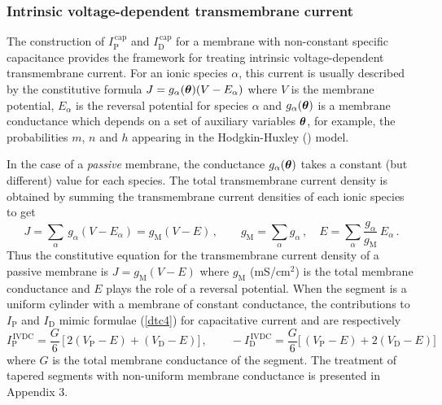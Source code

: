 \subsubsection{Intrinsic voltage-dependent transmembrane current}

The construction of $I^\mathrm{\,cap}_\mathrm{P}$ and
$I^\mathrm{\,cap}_\mathrm{D}$ for a membrane with non-constant
specific capacitance provides the framework for treating intrinsic
voltage-dependent transmembrane current. For an ionic species
$\alpha$, this current is usually described by the constitutive
formula $J=g_\alpha(\boldsymbol{\theta})(V-E_\alpha)$ where $V$ is the
membrane potential, $E_\alpha$ is the reversal potential for
species $\alpha$ and $g_\alpha(\boldsymbol{\theta})$ is a membrane
conductance which depends on a set of auxiliary variables
$\boldsymbol{\theta}$, for example, the probabilities $m$, $n$ and $h$
appearing in the Hodgkin-Huxley (\cite{Hodgkin52}) model.

In the case of a \emph{passive} membrane, the conductance
$g_\alpha(\boldsymbol{\theta})$ takes a constant (but different) value for
each species. The total transmembrane current density is obtained
by summing the transmembrane current densities of each ionic
species to get
\begin{equation}\label{dtc8}
J=\sum_\alpha\, g_\alpha(V-E_\alpha)= g_\mathrm{M}(V-E)\,,
\qquad g_\mathrm{M}=\sum_\alpha g_\alpha\,,\quad
E=\sum_\alpha \frac{g_\alpha}{g_\mathrm{M}}\, E_\alpha\,.
\end{equation}
Thus the constitutive equation for the transmembrane current
density of a passive membrane is $J=g_\mathrm{M}(V-E)$ where
$g_\mathrm{M}$ (mS/cm$^2$) is the total membrane conductance and
$E$ plays the role of a reversal potential. When the segment is a
uniform cylinder with a membrane of constant conductance, the
contributions to $I_\mathrm{P}$ and $I_\mathrm{D}$ mimic formulae
(\ref{dtc4}) for capacitative current and are respectively
\begin{equation}\label{dtc10}
I^\mathrm{\,IVDC}_\mathrm{P} = \frac{G}{6}\,
\Big[\,2(V_\mathrm{P}-E)+(V_\mathrm{D}-E)\Big]\,,\qquad
-I^\mathrm{\,IVDC}_\mathrm{D} = \frac{G}{6}
\Big[\,(V_\mathrm{P}-E)+2(V_\mathrm{D}-E)\Big]
\end{equation}
where $G$ is the total membrane conductance of the segment. The
treatment of tapered segments with non-uniform membrane
conductance is presented in Appendix 3.
